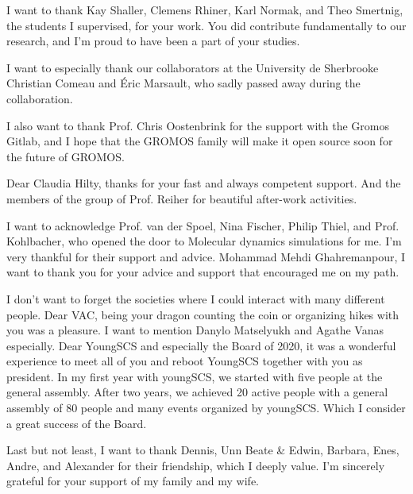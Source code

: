 I want to thank Kay Shaller, Clemens Rhiner, Karl Normak, and Theo Smertnig, the students I supervised, for your work. You did contribute fundamentally to our research, and I'm proud to have been a part of your studies.

I want to especially thank our collaborators at the University de Sherbrooke Christian Comeau and {\' E}ric Marsault, who sadly passed away during the collaboration.

I also want to thank Prof. Chris Oostenbrink for the support with the Gromos Gitlab, and I hope that the GROMOS family will make it open source soon for the future of GROMOS.


Dear Claudia Hilty, thanks for your fast and always competent support. And the members of the group of Prof. Reiher for beautiful after-work activities.

I want to acknowledge Prof. van der Spoel, Nina Fischer, Philip Thiel, and Prof. Kohlbacher, who opened the door to Molecular dynamics simulations for me. I'm very thankful for their support and advice.  
Mohammad Mehdi Ghahremanpour, I want to thank you for your advice and support that encouraged me on my path.

I don't want to forget the societies where I could interact with many different people.
Dear VAC, being your dragon counting the coin or organizing hikes with you was a pleasure. I want to mention Danylo Matselyukh and Agathe Vanas especially. 
Dear YoungSCS and especially the Board of 2020, it was a wonderful experience to meet all of you and reboot YoungSCS together with you as president. In my first year with youngSCS, we started with five people at the general assembly. After two years, we achieved 20 active people with a general assembly of 80 people and many events organized by youngSCS. Which I consider a great success of the Board.

Last but not least, I want to thank Dennis, Unn Beate \& Edwin, Barbara, Enes, Andre, and Alexander for their friendship, which I deeply value.
I'm sincerely grateful for your support of my family and my wife.
